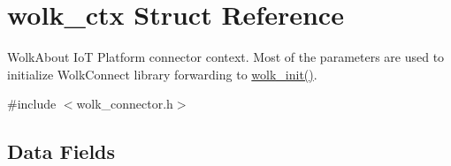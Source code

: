 \hypertarget{structwolk__ctx}{}\section{wolk\+\_\+ctx Struct Reference}
\label{structwolk__ctx}


Wolk\+About IoT Platform connector context. Most of the parameters are used to initialize Wolk\+Connect library forwarding to \hyperlink{wolk__connector_8h_a607b5439ae7741284a73312b7794fa7a}{wolk\+\_\+init()}.  




{\ttfamily \#include $<$wolk\+\_\+connector.\+h$>$}

\subsection*{Data Fields}
